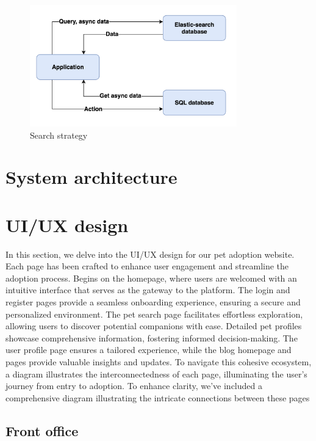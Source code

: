 \begin{figure}[H]
    \centering
    \includegraphics[width=0.8\textwidth]{Figures/search_strat.png}
    \caption{Search strategy}
\end{figure}

\section{System architecture}

\section{UI/UX design}

In this section, we delve into the UI/UX design for our pet adoption website. Each page has been crafted to enhance user engagement and streamline the adoption process. Begins on the homepage, where users are welcomed with an intuitive interface that serves as the gateway to the platform. The login and register pages provide a seamless onboarding experience, ensuring a secure and personalized environment. The pet search page facilitates effortless exploration, allowing users to discover potential companions with ease. Detailed pet profiles showcase comprehensive information, fostering informed decision-making. The user profile page ensures a tailored experience, while the blog homepage and pages provide valuable insights and updates. To navigate this cohesive ecosystem, a diagram illustrates the interconnectedness of each page, illuminating the user's journey from entry to adoption. To enhance clarity, we've included a comprehensive diagram illustrating the intricate connections between these pages
\subsection{Front office}

